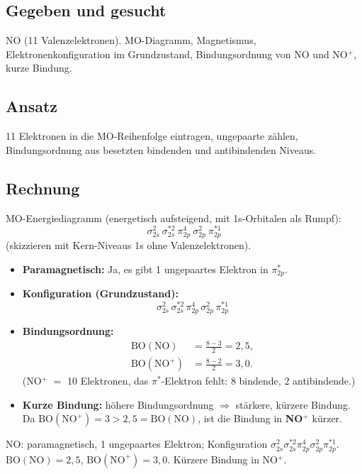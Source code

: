 
\subsection*{Gegeben und gesucht}
NO (11 Valenzelektronen). MO-Diagramm, Magnetismus, Elektronenkonfiguration
im Grundzustand, Bindungsordnung von NO und NO$^+$, kurze Bindung.

\subsection*{Ansatz}
11 Elektronen in die MO-Reihenfolge eintragen, ungepaarte z\"ahlen,
Bindungsordnung aus besetzten bindenden und antibindenden Niveaus.

\subsection*{Rechnung}
MO-Energiediagramm (energetisch aufsteigend, mit 1s-Orbitalen als
Rumpf):
\[
  \sigma_{2s}^{2}\ \sigma_{2s}^{*2}\ \pi_{2p}^{4}\ \sigma_{2p}^{2}\
  \pi_{2p}^{*1}
\]
(skizzieren mit Kern-Niveaus 1s ohne Valenzelektronen).

\begin{itemize}
  \item[a)] \textbf{Paramagnetisch:} Ja, es gibt 1 ungepaartes Elektron
        in $\pi^*_{2p}$.
  \item[b)] \textbf{Konfiguration (Grundzustand):}
        \[
          \sigma_{2s}^2\,\sigma_{2s}^{*2}\,\pi_{2p}^4\,\sigma_{2p}^2\,
          \pi_{2p}^{*1}
        \]
  \item[c)] \textbf{Bindungsordnung:}
        \begin{align*}
          \mathrm{BO(NO)} &= \frac{8-3}{2} = 2{,}5,\\
          \mathrm{BO(NO^+)} &= \frac{8-2}{2} = 3{,}0 .
        \end{align*}
        (NO$^+$ $=$ 10 Elektronen, das $\pi^*$-Elektron fehlt:
        $8$ bindende, $2$ antibindende.)
  \item[d)] \textbf{Kurze Bindung:} h\"ohere Bindungsordnung
        $\Rightarrow$ st\"arkere, k\"urzere Bindung. Da
        $\mathrm{BO(NO^+)}=3 > 2{,}5=\mathrm{BO(NO)}$, ist die Bindung in
        \textbf{NO$^+$} k\"urzer.
\end{itemize}

\begin{ergebnis}
NO: paramagnetisch, 1 ungepaartes Elektron; Konfiguration
$\sigma_{2s}^2\sigma_{2s}^{*2}\pi_{2p}^4\sigma_{2p}^2\pi_{2p}^{*1}$.
$\mathrm{BO(NO)}=2{,}5$, $\mathrm{BO(NO^+)}=3{,}0$. Kürzere Bindung in
NO$^+$.
\end{ergebnis}

